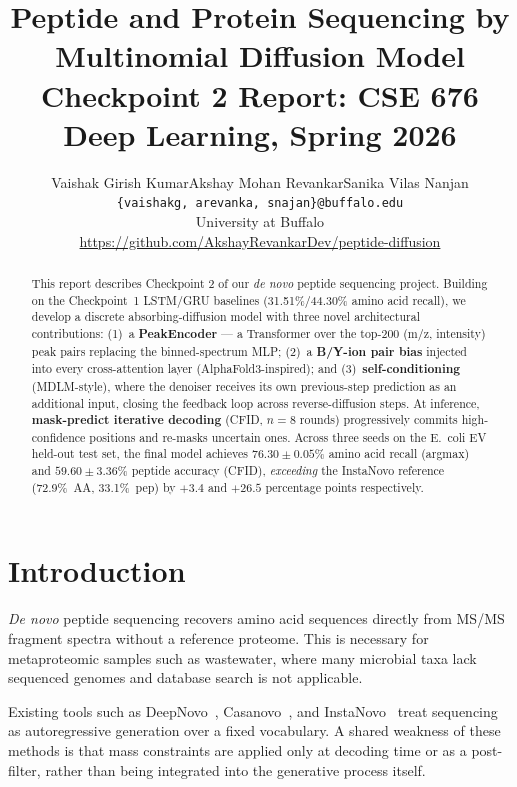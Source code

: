 \documentclass[11pt]{article}
\title{Peptide and Protein Sequencing by Multinomial Diffusion Model\\
\large Checkpoint 2 Report: CSE 676 Deep Learning, Spring 2026}
\author{%
  Vaishak Girish Kumar\quad Akshay Mohan Revankar\quad Sanika Vilas Nanjan \\
  \texttt{\{vaishakg, arevanka, snajan\}@buffalo.edu} \\
  University at Buffalo \\
  \small\url{https://github.com/AkshayRevankarDev/peptide-diffusion}
}
\begin{document}
\maketitle

\begin{abstract}
This report describes Checkpoint 2 of our \emph{de novo} peptide sequencing project.
Building on the Checkpoint~1 LSTM/GRU baselines (31.51\%/44.30\% amino acid recall),
we develop a discrete absorbing-diffusion model with three novel architectural
contributions: (1)~a \textbf{PeakEncoder} --- a Transformer over the top-200
(m/z, intensity) peak pairs replacing the binned-spectrum MLP; (2)~a \textbf{B/Y-ion
pair bias} injected into every cross-attention layer (AlphaFold3-inspired); and
(3)~\textbf{self-conditioning} (MDLM-style), where the denoiser receives its own
previous-step prediction as an additional input, closing the feedback loop across
reverse-diffusion steps.
At inference, \textbf{mask-predict iterative decoding} (CFID, $n{=}8$ rounds)
progressively commits high-confidence positions and re-masks uncertain ones.
Across three seeds on the E.~coli EV held-out test set, the final model achieves
$\mathbf{76.30 \pm 0.05\%}$ amino acid recall (argmax) and
$\mathbf{59.60 \pm 3.36\%}$ peptide accuracy (CFID), \emph{exceeding} the
InstaNovo reference (72.9\%~AA, 33.1\%~pep) by $+3.4$ and $+26.5$ percentage
points respectively.
\end{abstract}

\section{Introduction}

\emph{De novo} peptide sequencing recovers amino acid sequences directly from MS/MS
fragment spectra without a reference proteome. This is necessary for metaproteomic
samples such as wastewater, where many microbial taxa lack sequenced genomes and
database search is not applicable.

Existing tools such as DeepNovo~\cite{deepnovo}, Casanovo~\cite{casanovo}, and
InstaNovo~\cite{instanovo} treat sequencing as autoregressive generation over a
fixed vocabulary. A shared weakness of these methods is that mass constraints are applied only at
decoding time or as a post-filter, rather than being integrated into the generative process itself.
\end{document}
